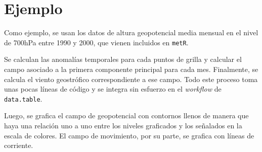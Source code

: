 \documentclass[runningheads]{llncs}
\begin{document}
\section{Ejemplo}\label{ejemplo}

Como ejemplo, se usan los datos de altura geopotencial media mensual en
el nivel de 700hPa entre 1990 y 2000, que vienen incluidos en
\texttt{metR}.

Se calculan las anomalías temporales para cada puntos de grilla y
calcular el campo asociado a la primera componente principal para cada
mes. Finalmente, se calcula el viento geostrófico correspondiente a ese
campo. Todo este proceso toma unas pocas líneas de código y se integra
sin esfuerzo en el \emph{workflow} de \texttt{data.table}.

\begin{Shaded}
\begin{Highlighting}[]
\NormalTok{geopotential[, gh.t }\OperatorTok{:}\ErrorTok{=}\StringTok{ }\StringTok{ }\NormalTok{(date))]}
\NormalTok{geopotential[, gh.t.w }\OperatorTok{:}\ErrorTok{=}\StringTok{ }\OperatorTok{*}\NormalTok{(}\OperatorTok{*}\OperatorTok{/}\NormalTok{))]}
\StringTok{ }\NormalTok{geopotential[, }\OperatorTok{~}\StringTok{ }\OperatorTok{|}\StringTok{ }\OperatorTok{+}\StringTok{ } \NormalTok{)}\OperatorTok{$}\StringTok{ }\NormalTok{(date))]}
\NormalTok{eof[, }\NormalTok{(}\NormalTok{, }\NormalTok{) }\OperatorTok{:}\ErrorTok{=}\StringTok{ }\StringTok{ }\NormalTok{.(month)]}
\end{Highlighting}
\end{Shaded}

Luego, se grafica el campo de geopotencial con contornos llenos de
manera que haya una relación uno a uno entre los niveles graficados y
los señalados en la escala de colores. El campo de movimiento, por su
parte, se grafica con líneas de corriente.
\end{document}
